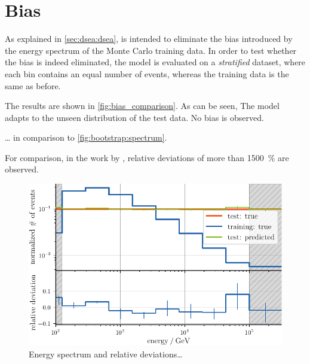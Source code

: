 \clearpage %
\section{Bias} \label{sec:unfolding:bias}
As explained in \autoref{sec:dsea:dsea},
\dsea{} is intended to eliminate the bias introduced by the energy spectrum of the Monte Carlo training data.
%
In order to test
whether the bias is indeed eliminated,
the model is evaluated on a \emph{stratified} dataset,
    where each bin contains an equal number of events,
whereas the training data is the same as before.

The results are shown in \autoref{fig:bias_comparison}.
As can be seen,
The model adapts to the unseen distribution of the test data.
No bias is observed.

… in comparison to \autoref{fig:bootstrap:spectrum}.

For comparison,
in the work by \citeauthor{dsea_samuel} \cite{dsea_samuel},
relative deviations of more than \SI{1500}{\percent} are observed.


\begin{figure}
  \centering
  \includegraphics[scale=1]{content/plots/bias:spectrum_full.pdf}
  \caption{
    Energy spectrum and relative deviations…
  }
  \label{fig:bias_comparison}
\end{figure}
